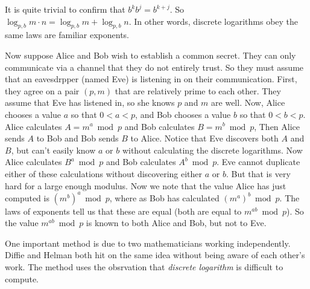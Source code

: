 It is quite trivial to confirm that $b^kb^j = b^{k+j}$. So $\log_{p,b} m \cdot n = \log_{p,b}m + \log_{p,b}n$. In other words, discrete logarithms obey the same laws are familiar exponents.

Now suppose Alice and Bob wish to establish a common secret. They can only communicate via a channel that they do not entirely trust. So they must assume that an eavesdrpper (named Eve) is listening in on their communication. First, they agree on a pair $(p,m)$ that are relatively prime to each other. They assume that Eve has listened in, so she knows $p$ and $m$ are well. Now, Alice chooses a value $a$ so that $0<a<p$, and Bob chooses a value $b$ so that $0<b<p$. Alice calculates $A = m^a\bmod p$ and Bob calculates $B = m^b \bmod p$, Then Alice sends $A$ to Bob and Bob sends $B$ to Alice. Notice that Eve discovers both $A$ and $B$, but can't easily know $a$ or $b$ without calculating the discrete logarithms. Now Alice calculates $B^a\bmod p$ and Bob calculates $A^b\bmod p$. Eve cannot duplicate either of these calculations without discovering either $a$ or $b$. But that is very hard for a large enough modulus. Now we note that the value Alice has just computed is $(m^b)^a \bmod p$, where as Bob has calculated $(m^a)^b\bmod p$. The laws of exponents tell us that these are equal (both are equal to $m^{ab}\bmod p$). So the value $m^{ab}\bmod p$ is known to both Alice and Bob, but not to Eve.



One important method is due to two mathematicians working independently. Diffie and Helman both hit on the same idea without being aware of each other's work. The method uses the obsrvation that \emph{discrete logarithm} is difficult to compute.
